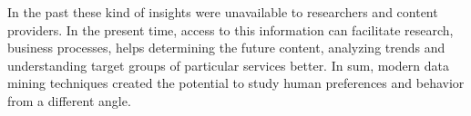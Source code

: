 In the past these kind of insights were unavailable to researchers and content providers. In the present time, access to this information can facilitate research, business processes, helps determining the future content, analyzing trends and understanding target groups of particular services better. In sum, modern data mining techniques created the potential to study human preferences and behavior from a different angle.


